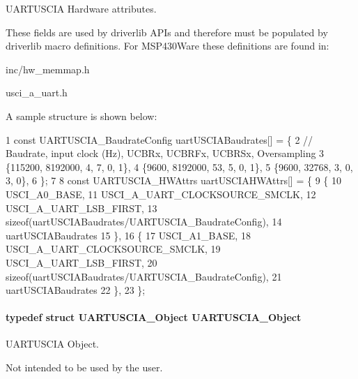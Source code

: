 U\+A\+R\+T\+U\+S\+C\+I\+A Hardware attributes. 

These fields are used by driverlib A\+P\+Is and therefore must be populated by driverlib macro definitions. For M\+S\+P430\+Ware these definitions are found in\+:
\begin{DoxyItemize}
\item inc/hw\+\_\+memmap.\+h
\item usci\+\_\+a\+\_\+uart.\+h
\end{DoxyItemize}

A sample structure is shown below\+: 
\begin{DoxyCode}
1 const UARTUSCIA\_BaudrateConfig uartUSCIABaudrates[] = \{
2  // Baudrate, input clock (Hz), UCBRx, UCBRFx, UCBRSx, Oversampling
3     \{115200,  8192000,          4,     7,      0,      1\},
4     \{9600,    8192000,          53,    5,      0,      1\},
5     \{9600,    32768,            3,     0,      3,      0\},
6 \};
7 
8 const UARTUSCIA\_HWAttrs uartUSCIAHWAttrs[] = \{
9     \{
10         USCI\_A0\_BASE,
11         USCI\_A\_UART\_CLOCKSOURCE\_SMCLK,
12         USCI\_A\_UART\_LSB\_FIRST,
13         sizeof(uartUSCIABaudrates/UARTUSCIA\_BaudrateConfig),
14         uartUSCIABaudrates
15     \},
16     \{
17         USCI\_A1\_BASE,
18         USCI\_A\_UART\_CLOCKSOURCE\_SMCLK,
19         USCI\_A\_UART\_LSB\_FIRST,
20         sizeof(uartUSCIABaudrates/UARTUSCIA\_BaudrateConfig),
21         uartUSCIABaudrates
22     \},
23 \};
\end{DoxyCode}
\paragraph[{U\+A\+R\+T\+U\+S\+C\+I\+A\+\_\+\+Object}]{\setlength{\rightskip}{0pt plus 5cm}typedef struct {\bf U\+A\+R\+T\+U\+S\+C\+I\+A\+\_\+\+Object}  {\bf U\+A\+R\+T\+U\+S\+C\+I\+A\+\_\+\+Object}}\label{_u_a_r_t_u_s_c_i_a_8h_ada23da6b4e4cb68cc02b428572a35039}


U\+A\+R\+T\+U\+S\+C\+I\+A Object. 

Not intended to be used by the user. 
